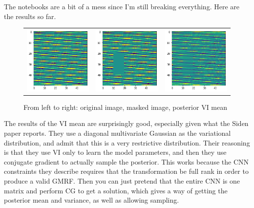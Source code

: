 \documentclass{article}
\begin{document}
The notebooks are a bit of a mess since I'm still breaking everything.
Here are the results so far.

\begin{figure}[H]
	\begin{tabular}{c c c}
		\includegraphics[width=0.33\linewidth]{images/original.png} &
		\includegraphics[width=0.33\linewidth]{images/masked.png} &
		\includegraphics[width=0.33\linewidth]{images/inpainted.png}
	\end{tabular}
	\caption{From left to right: original image, masked image, posterior VI mean}
\end{figure}

The results of the VI mean are surprisingly good, especially given what the
Siden paper reports. They use a diagonal multivariate Gaussian as the variational
distribution, and admit that this is a very restrictive distribution.
Their reasoning is that they use VI only to learn the model parameters, and then
they use conjugate gradient to actually sample the posterior. This works because
the CNN constraints they describe requires that the transformation be full rank
in order to produce a valid GMRF. Then you can just pretend that the entire
CNN is one matrix and perform CG to get a solution, which gives a way of getting
the posterior mean and variance, as well as allowing sampling.
\end{document}
